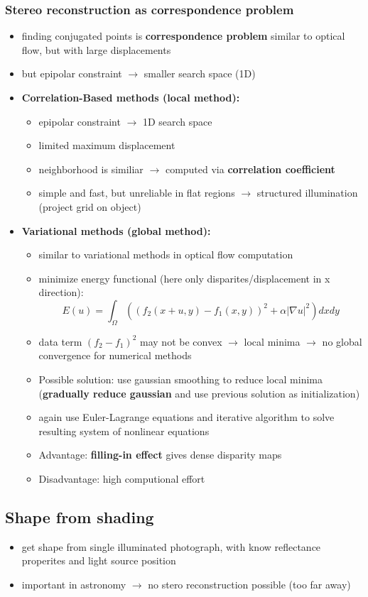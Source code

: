 \documentclass[11pt]{article}
\begin{document}
\subsubsection{Stereo reconstruction as correspondence problem}
\label{sec-6-2-4}
\begin{itemize}
\item finding conjugated points is \textbf{correspondence problem} similar to optical flow,
but with large displacements
\item but epipolar constraint $\rightarrow$ smaller search space (1D)
\item \textbf{Correlation-Based methods (local method):}
\begin{itemize}
\item epipolar constraint $\rightarrow$ 1D search space
\item limited maximum displacement
\item neighborhood is similiar $\rightarrow$ computed via \textbf{correlation coefficient}
\item simple and fast, but unreliable in flat regions $\rightarrow$ structured illumination
(project grid on object)
\end{itemize}
\item \textbf{Variational methods (global method):}
\begin{itemize}
\item similar to variational methods in optical flow computation
\item minimize energy functional (here only disparites/displacement in x direction):
        \[ E(u) = \int_\Omega ((f_2(x+u,y)-f_1(x,y))^2 + \alpha |\nabla u|^2)dx dy \]
\item data term $(f_2 - f_1)^2$ may not be convex $\rightarrow$ local minima
        $\rightarrow$ no global convergence for numerical methods
\item Possible solution: use gaussian smoothing to reduce local minima
(\textbf{gradually reduce gaussian} and use previous solution as initialization)
\item again use Euler-Lagrange equations and iterative algorithm to solve resulting
system of nonlinear equations
\item Advantage: \textbf{filling-in effect} gives dense disparity maps
\item Disadvantage: high computional effort
\end{itemize}
\end{itemize}
\subsection{Shape from shading}
\label{sec-6-3}
\begin{itemize}
\item get shape from single illuminated photograph, with know reflectance properites and
light source position
\item important in astronomy $\rightarrow$ no stero reconstruction possible (too far away)
\end{itemize}
\end{document}
